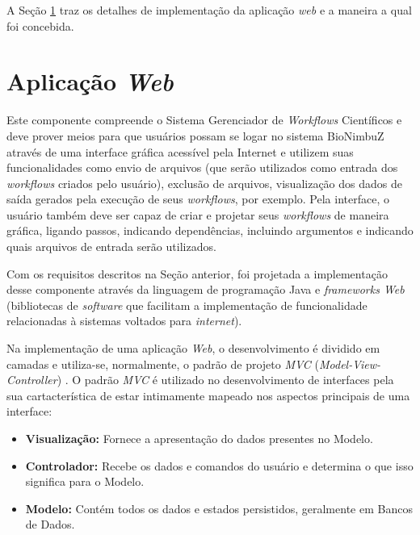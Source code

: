 A Seção \ref{cap5sec4} traz os detalhes de implementação da aplicação \textit{web} e a maneira a qual foi concebida.

\section{Aplicação \textit{Web}} \label{cap5sec4}
    
	Este componente compreende o Sistema Gerenciador de \textit{Workflows} Científicos e deve prover meios para que usuários possam se logar no sistema BioNimbuZ através de uma interface gráfica acessível pela Internet e utilizem suas funcionalidades como envio de arquivos (que serão utilizados como entrada dos \textit{workflows} criados pelo usuário), exclusão de arquivos, visualização dos dados de saída gerados pela execução de seus \textit{workflows}, por exemplo. Pela interface, o usuário também deve ser capaz de criar e projetar seus \textit{workflows} de maneira gráfica, ligando passos, indicando dependências, incluindo argumentos e indicando quais arquivos de entrada serão utilizados.
    
Com os requisitos descritos na Seção anterior, foi projetada a implementação desse componente através da linguagem de programação Java e \textit{frameworks Web} (bibliotecas de \textit{software} que facilitam a implementação de funcionalidade relacionadas à sistemas voltados para \textit{internet}). 

Na implementação de uma aplicação \textit{Web}, o desenvolvimento é dividido em camadas e utiliza-se, normalmente, o padrão de projeto \textit{MVC} (\textit{Model-View-Controller}) \cite{design_patterns}. O padrão \textit{MVC} é utilizado no desenvolvimento de interfaces pela sua cartacterística de estar intimamente mapeado nos aspectos principais de uma interface: 

\begin{itemize}
	\item \textbf{Visualização:} Fornece a apresentação do dados presentes no Modelo.
    \item \textbf{Controlador:} Recebe os dados e comandos do usuário e determina o que isso significa para o Modelo.
    \item \textbf{Modelo:} Contém todos os dados e estados persistidos, geralmente em Bancos de Dados.
\end{itemize}

